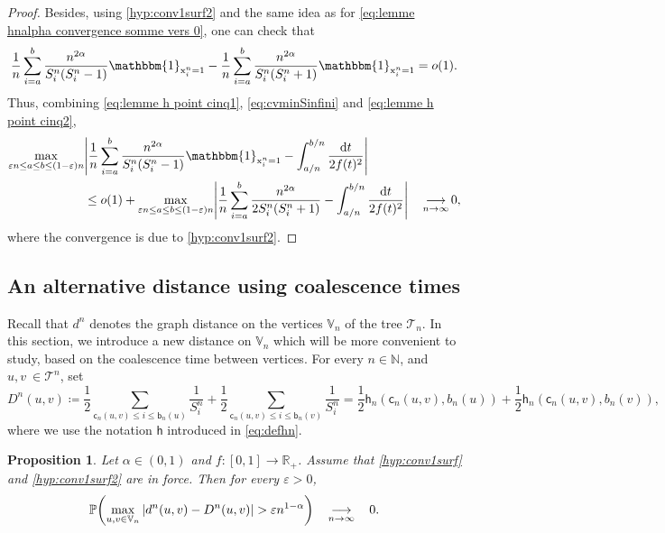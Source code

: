 \documentclass[11pt]{article}
\theoremstyle{plain}
\newtheorem{proposition}[theorem]{Proposition}
\theoremstyle{definition}
\theoremstyle{remark}
\newcommand{\N}{\mathbb{N}} %
\newcommand{\R}{\mathbb{R}} %
\renewcommand{\P}{{\mathbb{P}}} %
\newcommand{\1}{\mathbbm{1}} %
\newcommand{\proba}[1]{\mathbb{P}\left(#1\right)} %
\newcommand{\e}{\varepsilon} %
\newcommand{\T}{\mathcal{T}} %
\newcommand{\birth}{\mathsf{b}} %
\newcommand{\coal}{\mathsf{c}} %
\newcommand{\h}{\mathsf{h}} %
\newcommand{\X}{\mathrm x} %
\newcommand{\V}{\mathbb{V}} %
\newcommand{\dc}{D} %
\let\originalleft\left
\let\originalright\right
\renewcommand{\left}{\mathopen{}\mathclose\bgroup\originalleft}
\renewcommand{\right}{\aftergroup\egroup\originalright}
\begin{document}
\begin{proof}
{
Besides, using \ref{hyp:conv1surf2} and the same idea as for \eqref{eq:lemme hnalpha convergence somme vers 0}, one can check that
\begin{equation}\label{eq:lemme h point cinq2}
\frac{1}{n}\sum_{i=a}^b \frac{n^{2\alpha}}{S^n_i (S^n_i-1)} \1_{\X^n_i=1} - \frac{1}{n}\sum_{i=a}^b \frac{n^{2\alpha}}{S^n_i (S^n_i+1)} \1_{\X^n_i=1} = o(1).
\end{equation}
} Thus, combining \eqref{eq:lemme h point cinq1}, \eqref{eq:cvminSinfini} and \eqref{eq:lemme h point cinq2}, 
\begin{align*}
\max_{\e n \le a \le b \le (1-\e)n}
&\left\vert
\frac{1}{n} \sum_{i=a}^b \frac{n^{2\alpha}}{S^n_i(S^n_i-1)} \1_{\X^n_i=1}
-\int_{a/n}^{b/n} \frac{\mathrm{d}t}{2 f(t)^2}
\right\vert
\\
&\le o(1) + 
\max_{\e n \le a \le b \le (1-\e)n}
\left\vert
\frac{1}{n} \sum_{i=a}^b \frac{n^{2\alpha}}{2S^n_i(S^n_i+1)} 
-\int_{a/n}^{b/n} \frac{\mathrm{d}t}{2 f(t)^2}
\right\vert
\quad
\mathop{\longrightarrow}\limits_{n\to \infty}
0,
\end{align*}
where the convergence is due to \ref{hyp:conv1surf2}.
\end{proof}
\subsection{An alternative distance using  coalescence times}
\label{ssec:newdistance}

{Recall that $d^{n}$ denotes the graph distance on the vertices $\V_{n}$ of the tree $\T_n$.}  In this section, we introduce a new distance on {$\V_{n}$}  which will be more convenient to study, based on the coalescence time {between vertices}.  For every $n\in \N$, and $u,v\ \in \mathcal{T}^{n}$, set
\[ \dc^n(u,v) \coloneqq  \frac{1}{2}\sum_{\coal_n(u,v) \leqslant  i  \leqslant \birth_n(u)}\frac{1}{S^n_i}+ \frac{1}{2}\sum_{\coal_n(u,v) \leqslant  i \leqslant \birth_{n}(v)}\frac{1}{S^n_i} = \frac{1}{2} \h_n(\coal_{n}(u,v),b_{n}(u))+ \frac{1}{2}\h_n(\coal_{n}(u,v),b_{n}(v)),\]
where we use the notation $\h$ introduced in \eqref{eq:defhn}.
\begin{proposition}
\label{height=ok}
Let $\alpha \in (0,1)$ and $f:[0,1] \rightarrow \R_+$. Assume that \ref{hyp:conv1surf} and \ref{hyp:conv1surf2} are in force. Then for every $\e>0$,
\[
\P \left (\max_{u,v\in \V_{n}} |d^n(u,v)-\dc^n(u,v)|>\e n^{1-\alpha} \right )  \quad \mathop{\longrightarrow}_{n \rightarrow \infty} \quad  0.
\]
\end{proposition}
\end{document}
